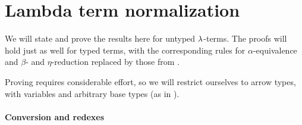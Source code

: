\section{Lambda term normalization}\label{sec:lambda_term_normalization}

We will state and prove the results here for untyped \( {\mathrm \lambda} \)-terms. The proofs will hold just as well for typed terms, with the corresponding rules for \( \alpha \)-equivalence and \( \beta \)- and \( \eta \)-reduction replaced by those from .

Proving  requires considerable effort, so we will restrict ourselves to arrow types, with variables and arbitrary base types (as in ).

\paragraph{Conversion and redexes}

